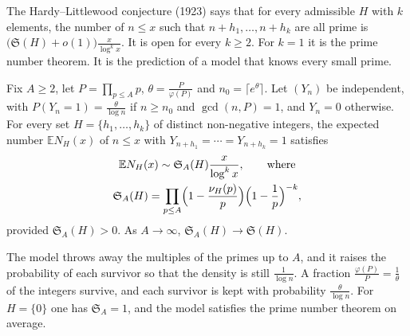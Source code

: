 The Hardy--Littlewood conjecture (1923) says that for every admissible $H$ with $k$ elements, the number of $n\le x$ such that $n+h_1,\dots,n+h_k$ are all prime is $\bigl(\mathfrak S(H)+o(1)\bigr)\frac x{\log^kx}$. It is open for every $k\ge2$. For $k=1$ it is the prime number theorem. It is the prediction of a model that knows every small prime.

\begin{proposition}\label{prop:smallprimes}
Fix $A\ge2$, let $P=\prod_{p\le A}p$, $\theta=\frac P{\varphi(P)}$ and $n_0=\lceil e^\theta\rceil$. Let $(Y_n)$ be independent, with $P(Y_n=1)=\frac\theta{\log n}$ if $n\ge n_0$ and $\gcd(n,P)=1$, and $Y_n=0$ otherwise.
For every set $H=\{h_1,\dots,h_k\}$ of distinct non-negative integers, the expected number $\mathbb EN_H(x)$ of $n\le x$ with $Y_{n+h_1}=\cdots=Y_{n+h_k}=1$ satisfies
\[
\begin{gathered}\mathbb EN_H(x)\sim\mathfrak S_A(H)\frac x{\log^kx},\qquad\text{where}\\\mathfrak S_A(H)=\prod_{p\le A}\Bigl(1-\frac{\nu_H(p)}p\Bigr)\Bigl(1-\frac1p\Bigr)^{-k},\end{gathered}
\]
provided $\mathfrak S_A(H)>0$. As $A\to\infty$, $\mathfrak S_A(H)\to\mathfrak S(H)$.
\end{proposition}

The model throws away the multiples of the primes up to $A$, and it raises the probability of each survivor so that the density is still $\frac1{\log n}$. A fraction $\frac{\varphi(P)}P=\frac1\theta$ of the integers survive, and each survivor is kept with probability $\frac\theta{\log n}$. For $H=\{0\}$ one has $\mathfrak S_A=1$, and the model satisfies the prime number theorem on average.

